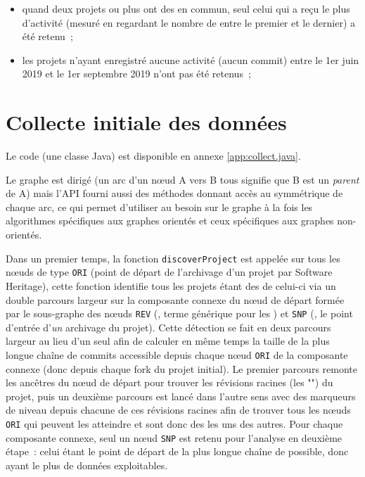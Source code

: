 \begin{itemize}
    \item quand deux projets ou plus ont des  en commun, seul
        celui qui a reçu le plus d'activité (mesuré en regardant le nombre de
         entre le premier et le dernier) a été retenu ;
    \item les projets n'ayant enregistré aucune activité (aucun commit) entre le
        1er juin 2019 et le 1er septembre 2019 n'ont pas été retenus ;
\end{itemize}

\section{Collecte initiale des données}


Le code (une classe Java) est disponible en annexe \ref{app:collect.java}.

Le graphe est dirigé (un arc d'un nœud A vers B tous signifie que B est un  \emph{parent} de A)
mais l'API fourni aussi des méthodes donnant accès au symmétrique de chaque arc, ce qui permet d'utiliser au
besoin sur le graphe à la fois les algorithmes spécifiques aux graphes orientés et ceux spécifiques aux
graphes non-orientés.

Dans un premier temps, la fonction \texttt{discoverProject} est appelée sur tous les nœuds de type
\texttt{ORI} (point de départ de l'archivage d'un projet par Software Heritage), cette fonction identifie tous
les projets étant des  de celui-ci via un double parcours largeur sur la composante connexe du nœud
de départ formée par le sous-graphe des nœuds \texttt{REV} (, terme générique pour les
) et \texttt{SNP} (, le point d'entrée d'\emph{un} archivage du projet). Cette
détection se fait en deux parcours largeur au lieu d'un seul afin de calculer en même temps la taille de la
plus longue chaîne de commits accessible depuis chaque nœud \texttt{ORI} de la composante connexe (donc depuis
chaque fork du projet initial). Le premier parcours remonte les ancêtres du nœud de départ pour trouver les
révisions racines (les "") du projet, puis un deuxième parcours est lancé dans l'autre
sens avec des marqueurs de niveau depuis chacune de ces révisions racines afin de trouver tous les nœuds
\texttt{ORI} qui peuvent les atteindre et sont donc des  les uns des autres. Pour chaque composante
connexe, seul un nœud \texttt{SNP} est retenu pour l'analyse en deuxième étape : celui étant le point de
départ de la plus longue chaîne de  possible, donc ayant le plus de données exploitables.

